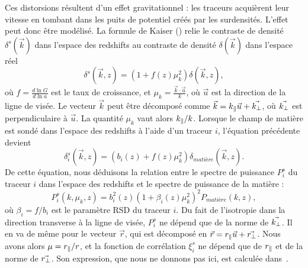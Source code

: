 \documentclass[11pt, twoside, a4paper, openright]{report}
\begin{document}
Ces distorsions résultent d'un effet gravitationnel : les traceurs acquièrent leur vitesse en tombant dans les puits de potentiel créés par les surdensités. L'effet peut donc être modélisé.
La formule de Kaiser (\cite{kaiser_clustering_1987}) relie le contraste de densité $\delta^s(\vec k)$ dans l'espace des redshifts au contraste de densité $\delta(\vec k)$ dans l'espace réel
\begin{equation}
  \label{eq:kaiser}
  \delta^{s}(\vec k, z) = (1 + f(z) \mu_k^2) \delta(\vec k, z) ,
\end{equation}
où $f = \displaystyle \frac{d \ln{G}}{d \ln{a}}$ est le taux de croissance, et $\mu_k = \displaystyle \frac{\vec k \cdot \vec u}{k}$, où $\vec u$ est la direction de la ligne de visée.
Le vecteur $\vec k$ peut être décomposé comme $\vec k = k_{\parallel}{} \vec u + \vec {k_{\perp}}{}$, où $\vec {k_{\perp}}{}$ est perpendiculaire à $\vec u$. La quantité $\mu_k$ vaut alors $k_{\parallel}{} / k$. 
Lorsque le champ de matière est sondé dans l'espace des redshifts à l'aide d'un traceur $i$, l'équation précédente devient
\begin{equation}
  \label{eq:kaiser2}
  \delta_i^{s}(\vec k, z) = (b_i(z) + f(z) \mu_k^2) \delta_{matière}(\vec k, z) .
\end{equation}
De cette équation, nous déduisons la relation entre le spectre de puissance $P_{i}^{s}$ du traceur $i$ dans l'espace des redshifts et le spectre de puissance de la matière :
\begin{equation}
  \label{eq:kaiser3}
  P_{i}^s(k, \mu_k, z) = b_{i}^2(z)(1 + \beta_i(z) \mu_k^2)^2 P_{matière}(k, z) ,
\end{equation}
où $\beta_i = f / b_i$ est le paramètre RSD du traceur $i$.
Du fait de l'isotropie dans la direction transverse à la ligne de visée, $P_i^s$ ne dépend que de la norme de $\vec {k_{\perp}}{}$. Il en va de même pour le vecteur $\vec r$, qui est décomposé en $\vec r =  r_{\parallel}{} \vec u + \vec {r_{\perp}}{}$. Nous avons alors $\mu = r_{\parallel}{} / r$, et la fonction de corrélation $\xi_i^s$ ne dépend que de $r_{\parallel}{}$ et de la norme de $\vec {r_{\perp}}{}$. Son expression, que nous ne donnons pas ici, est calculée dans~\cite{Hamilton1992}.
\end{document}
